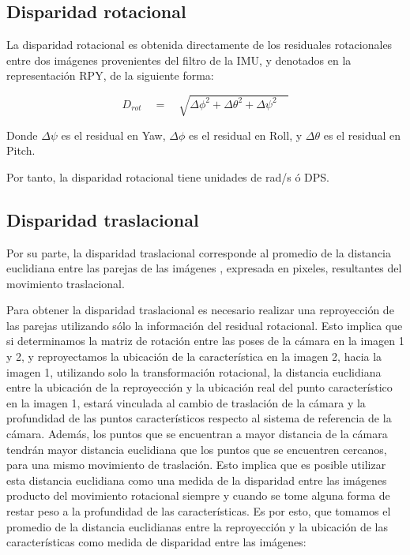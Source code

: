 \subsection{Disparidad rotacional}
La disparidad rotacional es obtenida directamente de los residuales rotacionales entre dos imágenes provenientes del filtro de la IMU, y denotados en la representación RPY, de la siguiente forma:

\begin{equation}
{ D }_{ rot }\quad =\quad \sqrt { { \Delta \phi  }^{ 2 }+{ \Delta \theta  }^{ 2 }+{ \Delta \psi  }^{ 2 }\quad  }
\label{eq:disparidadRotacional}
\end{equation}

Donde ${\Delta \psi}$ es el residual en Yaw, ${\Delta \phi}$ es el residual en Roll, y ${\Delta \theta}$ es el residual en Pitch.

Por tanto, la disparidad rotacional tiene unidades de rad/s ó DPS.


\subsection{Disparidad traslacional}

Por su parte, la disparidad traslacional corresponde al promedio de la distancia euclidiana entre las parejas de las imágenes , expresada en pixeles, resultantes del movimiento traslacional. 


Para obtener la disparidad traslacional es necesario realizar una reproyección de las parejas utilizando sólo la información del residual rotacional. Esto implica que si determinamos la matriz de rotación entre las poses de la cámara en la imagen 1 y 2, y reproyectamos la ubicación de la característica en la imagen 2, hacia la imagen 1, utilizando solo la transformación rotacional, la distancia euclidiana entre la ubicación de la reproyección y la ubicación real del punto característico en la imagen 1, estará vinculada al cambio de traslación de la cámara y la profundidad de las puntos característicos respecto al sistema de referencia de la cámara.
Además, los puntos que se encuentran a mayor distancia de la cámara tendrán mayor distancia euclidiana que los puntos que se encuentren cercanos, para una mismo movimiento de traslación. Esto implica que es posible utilizar esta distancia euclidiana como una medida de la disparidad entre las imágenes producto del movimiento rotacional siempre y cuando se tome alguna forma de restar peso a la profundidad de las características. Es por esto, que tomamos el promedio de la distancia euclidianas entre la reproyección y la ubicación de las características como medida de disparidad entre las imágenes:

